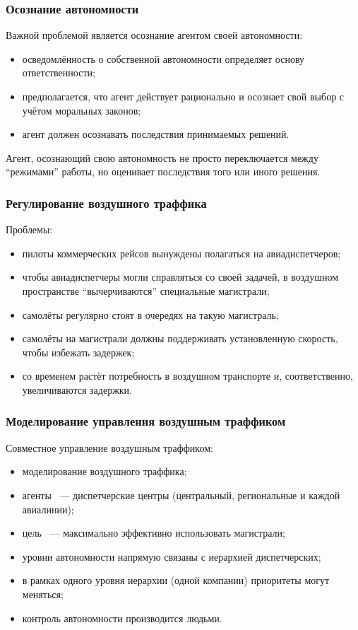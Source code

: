\documentclass{beamer}
\begin{document}
\begin{frame}
  \frametitle{Осознание автономности}
  Важной проблемой является осознание агентом своей автономности:
  \begin{itemize}
    \item осведомлённость о собственной автономности определяет основу ответственности;
    \item предполагается, что агент действует рационально и осознает свой выбор
      с учётом моральных законов;
    \item агент должен осознавать последствия принимаемых решений.
  \end{itemize}

  Агент, осознающий свою автономность не просто переключается между ``режимами'' работы,
  но оценивает последствия того или иного решения.
\end{frame}

\begin{frame}
  \frametitle{Регулирование воздушного траффика}
  Проблемы:
  \begin{itemize}
    \item пилоты коммерческих рейсов вынуждены полагаться на авиадиспетчеров;
    \item чтобы авиадиспетчеры могли справляться со своей задачей, в воздушном
      пространстве ``вычерчиваются'' специальные магистрали;
    \item самолёты регулярно стоят в очередях на такую магистраль;
    \item самолёты на магистрали должны поддерживать установленную скорость,
      чтобы избежать задержек;
    \item со временем растёт потребность в воздушном транспорте и, соответственно,
      увеличиваются задержки.
  \end{itemize}
\end{frame}

\begin{frame}
  \frametitle{Моделирование управления воздушным траффиком}
  Совместное управление воздушным траффиком:
  \begin{itemize}
    \item моделирование воздушного траффика;
    \item агенты ~--- диспетчерские центры (центральный, региональные и каждой авиалинии);
    \item цель ~--- максимально эффективно использовать магистрали;
    \item уровни автономности напрямую связаны с иерархией диспетчерских;
    \item в рамках одного уровня иерархии (одной компании) приоритеты могут меняться;
    \item контроль автономности производится людьми.
  \end{itemize}
\end{frame}
\end{document}
